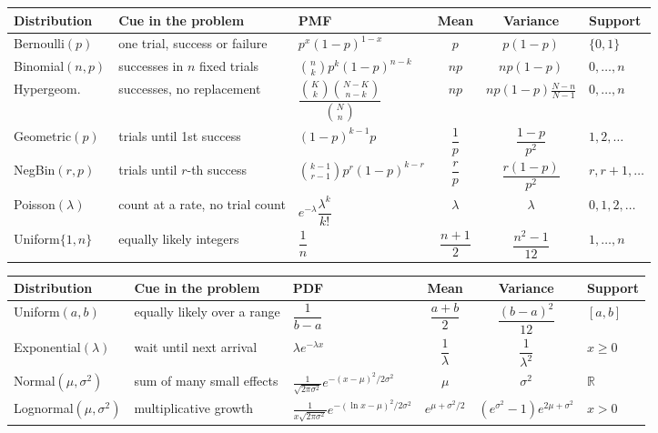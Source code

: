 \begin{keybox}
\begin{center}
\footnotesize
\setlength{\tabcolsep}{3pt}
\begin{tabular}{@{}lllccl@{}}
\toprule
\textbf{Distribution} & \textbf{Cue in the problem} & \textbf{PMF} & \textbf{Mean} & \textbf{Variance} & \textbf{Support} \\
\midrule
Bernoulli$(p)$ & one trial, success or failure & $p^x(1-p)^{1-x}$ & $p$ & $p(1-p)$ & $\{0,1\}$ \\[0.35em]
Binomial$(n,p)$ & successes in $n$ fixed trials & $\binom{n}{k}p^k(1-p)^{n-k}$ & $np$ & $np(1-p)$ & $0,\dots,n$ \\[0.35em]
Hypergeom. & successes, no replacement & $\dfrac{\binom{K}{k}\binom{N-K}{n-k}}{\binom{N}{n}}$ & $np$ & $np(1-p)\frac{N-n}{N-1}$ & $0,\dots,n$ \\[0.5em]
Geometric$(p)$ & trials until 1st success & $(1-p)^{k-1}p$ & $\dfrac{1}{p}$ & $\dfrac{1-p}{p^2}$ & $1,2,\dots$ \\[0.5em]
NegBin$(r,p)$ & trials until $r$-th success & $\binom{k-1}{r-1}p^r(1-p)^{k-r}$ & $\dfrac{r}{p}$ & $\dfrac{r(1-p)}{p^2}$ & $r, r+1,\dots$ \\[0.5em]
Poisson$(\lambda)$ & count at a rate, no trial count & $e^{-\lambda}\dfrac{\lambda^k}{k!}$ & $\lambda$ & $\lambda$ & $0,1,2,\dots$ \\[0.35em]
Uniform$\{1,n\}$ & equally likely integers & $\dfrac{1}{n}$ & $\dfrac{n+1}{2}$ & $\dfrac{n^2-1}{12}$ & $1,\dots,n$ \\
\bottomrule
\end{tabular}
\end{center}
\end{keybox}

\vspace{2ex}

\begin{keybox}
\begin{center}
\footnotesize
\setlength{\tabcolsep}{3pt}
\begin{tabular}{@{}lllccl@{}}
\toprule
\textbf{Distribution} & \textbf{Cue in the problem} & \textbf{PDF} & \textbf{Mean} & \textbf{Variance} & \textbf{Support} \\
\midrule
Uniform$(a,b)$ & equally likely over a range & $\dfrac{1}{b-a}$ & $\dfrac{a+b}{2}$ & $\dfrac{(b-a)^2}{12}$ & $[a,b]$ \\[0.5em]
Exponential$(\lambda)$ & wait until next arrival & $\lambda e^{-\lambda x}$ & $\dfrac{1}{\lambda}$ & $\dfrac{1}{\lambda^2}$ & $x \geq 0$ \\[0.5em]
Normal$(\mu,\sigma^2)$ & sum of many small effects & $\frac{1}{\sqrt{2\pi\sigma^2}}e^{-(x-\mu)^2/2\sigma^2}$ & $\mu$ & $\sigma^2$ & $\mathbb{R}$ \\[0.5em]
Lognormal$(\mu,\sigma^2)$ & multiplicative growth & $\frac{1}{x\sqrt{2\pi\sigma^2}}e^{-(\ln x-\mu)^2/2\sigma^2}$ & $e^{\mu+\sigma^2/2}$ & $(e^{\sigma^2}\!-\!1)e^{2\mu+\sigma^2}$ & $x > 0$ \\
\bottomrule
\end{tabular}
\end{center}
\end{keybox}

